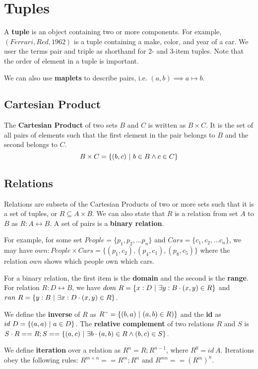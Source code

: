 \documentclass[12pt]{article}
\begin{document}
\section*{Tuples}
A {\bf tuple} is an object containing two or more components. For example, $(Ferrari, Red, 1962)$ is a tuple containing a make, color, and year of a car. We user the terms pair and triple as shorthand for 2- and 3-item tuples. Note that the order of element in a tuple is important.

We can also use {\bf maplets} to describe pairs, i.e. $(a,b) \implies a \mapsto b$.

\subsection*{Cartesian Product}
The {\bf Cartesian Product} of two sets $B$ and $C$ is written as $B \times C$. It is the set of all pairs of elements such that the first element in the pair belongs to $B$ and the second belongs to $C$. \[ B \times C = \{ (b,c) \ |\  b \in B \land c \in C \} \]

\subsection*{Relations}
Relations are subsets of the Cartesian Products of two or more sets such that it is a set of tuples, or $R \subseteq A \times B$. We can also state that $R$ is a relation from set $A$ to $B$ as $R : A \leftrightarrow B$. A set of pairs is a {\bf binary relation}.

For example, for some set $People = \{ p_1, p_2, \dots p_n \}$ and $Cars = \{ c_1, c_2, \dots c_n \}$, we may have $own: People \times Cars = \{ (p_1, c_2), (p_4, c_1), (p_8, c_5) \}$ where the relation $own$ shows which people own which cars.

For a binary relation, the first item is the {\bf domain} and the second is the {\bf range}. For relation $R : D \leftrightarrow B$, we have $dom\ R = \{ x : D \ |\  \exists y : B \cdot (x,y) \in R \}$ and $ran\ R = \{ y : B \ |\  \exists x : D \cdot (x,y) \in R \}$.

We define the {\bf inverse} of $R$ as $R^\ttilde = \{ (b,a) \suchthat (a,b) \in R) \}$ and the {\bf id} as $id\ D = \{ (a,a) \ |\  a \in D \}$. The {\bf relative complement} of two relations $R$ and $S$ is $S \cdot R == R; S == \{ (a,c) \ |\  \exists b \cdot (a,b) \in R \land (b,c) \in S \}$.

We define {\bf iteration} over a relation as $R^n = R; R^{n-1}$, where $R^0 = id\ A$. Iterations obey the following rules: $R^{m+n} == R^m; R^n$ and $R^{mn} == (R^m)^n$.
\end{document}

